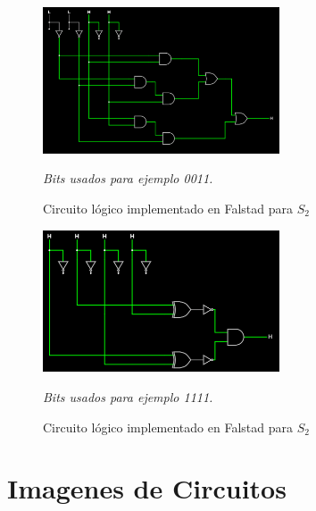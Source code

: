\begin{figure}[h!]
    \centering
    \includegraphics[width=7cm]{imagenes/2.2_S1.png}
    \caption{Circuito lógico implementado en Falstad para $S_2$}
    \label{fig:falstad_s2}
    \footnotesize\textit{Bits usados para ejemplo 0011.}
\end{figure}


\begin{figure}[h!]
    \centering
    \includegraphics[width=7cm]{imagenes/2.2_S2.png}
    \caption{Circuito lógico implementado en Falstad para $S_2$}
    \label{fig:falstad_s2}
    \footnotesize\textit{Bits usados para ejemplo 1111.}
\end{figure}


\section{Imagenes de Circuitos}


